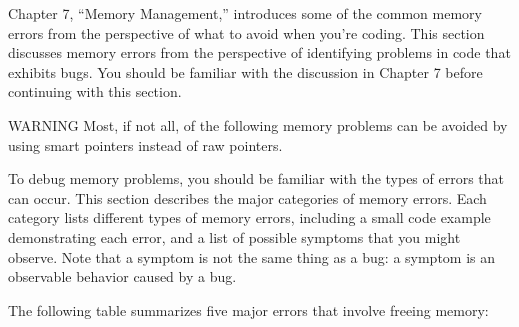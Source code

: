 Chapter 7, “Memory Management,” introduces some of the common memory errors from the perspective of what to avoid when you’re coding. This section discusses memory errors from the perspective of identifying problems in code that exhibits bugs. You should be familiar with the discussion in Chapter 7 before continuing with this section.

\begin{myWarning}{WARNING}
Most, if not all, of the following memory problems can be avoided by using smart pointers instead of raw pointers.
\end{myWarning}


To debug memory problems, you should be familiar with the types of errors that can occur. This section describes the major categories of memory errors. Each category lists different types of memory errors, including a small code example demonstrating each error, and a list of possible symptoms that you might observe. Note that a symptom is not the same thing as a bug: a symptom is an observable behavior caused by a bug.


The following table summarizes five major errors that involve freeing memory:

